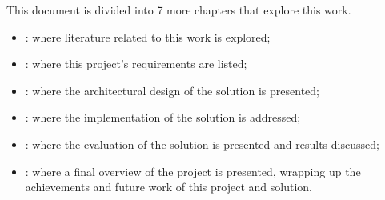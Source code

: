 This document is divided into 7 more chapters that explore this work.

\begin{itemize}
    \item {}: where literature related to this work is explored;
    \item {}: where this project's requirements are listed;
    \item {}: where the architectural design of the solution is presented;
    \item {}: where the implementation of the solution is addressed;
    \item {}: where the evaluation of the solution is presented and results discussed;
    \item {}: where a final overview of the project is presented, wrapping up the achievements and future work of this project and solution.
\end{itemize}
